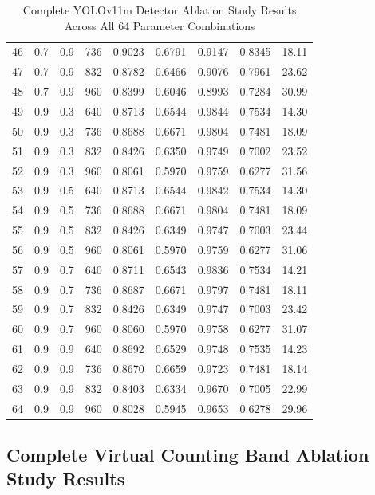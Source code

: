 \begin{table}[h]
{\begin{tabular}{|c|c|c|c|c|c|c|c|c|}
46 & 0.7 & 0.9 & 736 & 0.9023 & 0.6791 & 0.9147 & 0.8345 & 18.11 \\
47 & 0.7 & 0.9 & 832 & 0.8782 & 0.6466 & 0.9076 & 0.7961 & 23.62 \\
48 & 0.7 & 0.9 & 960 & 0.8399 & 0.6046 & 0.8993 & 0.7284 & 30.99 \\
49 & 0.9 & 0.3 & 640 & 0.8713 & 0.6544 & 0.9844 & 0.7534 & 14.30 \\
50 & 0.9 & 0.3 & 736 & 0.8688 & 0.6671 & 0.9804 & 0.7481 & 18.09 \\
51 & 0.9 & 0.3 & 832 & 0.8426 & 0.6350 & 0.9749 & 0.7002 & 23.52 \\
52 & 0.9 & 0.3 & 960 & 0.8061 & 0.5970 & 0.9759 & 0.6277 & 31.56 \\
53 & 0.9 & 0.5 & 640 & 0.8713 & 0.6544 & 0.9842 & 0.7534 & 14.30 \\
54 & 0.9 & 0.5 & 736 & 0.8688 & 0.6671 & 0.9804 & 0.7481 & 18.09 \\
55 & 0.9 & 0.5 & 832 & 0.8426 & 0.6349 & 0.9747 & 0.7003 & 23.44 \\
56 & 0.9 & 0.5 & 960 & 0.8061 & 0.5970 & 0.9759 & 0.6277 & 31.06 \\
57 & 0.9 & 0.7 & 640 & 0.8711 & 0.6543 & 0.9836 & 0.7534 & 14.21 \\
58 & 0.9 & 0.7 & 736 & 0.8687 & 0.6671 & 0.9797 & 0.7481 & 18.11 \\
59 & 0.9 & 0.7 & 832 & 0.8426 & 0.6349 & 0.9747 & 0.7003 & 23.42 \\
60 & 0.9 & 0.7 & 960 & 0.8060 & 0.5970 & 0.9758 & 0.6277 & 31.07 \\
61 & 0.9 & 0.9 & 640 & 0.8692 & 0.6529 & 0.9748 & 0.7535 & 14.23 \\
62 & 0.9 & 0.9 & 736 & 0.8670 & 0.6659 & 0.9723 & 0.7481 & 18.14 \\
63 & 0.9 & 0.9 & 832 & 0.8403 & 0.6334 & 0.9670 & 0.7005 & 22.99 \\
64 & 0.9 & 0.9 & 960 & 0.8028 & 0.5945 & 0.9653 & 0.6278 & 29.96 \\
\hline
\end{tabular}%
}
\caption{Complete YOLOv11m Detector Ablation Study Results Across All 64 Parameter Combinations}
\label{tab:YOLO11m_Complete_Ablation}
\end{table}


\newpage
\subsection{Complete Virtual Counting Band Ablation Study Results}

